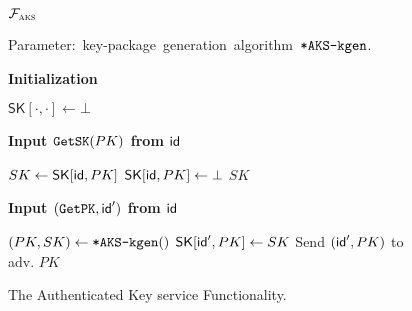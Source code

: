 \begin{figure}[!tbp]
	\vspace*{-1.5em}\begin{systembox}{$\mathcal{F}_{\normalfont\textsc{aks}}$}
		\begin{flushleft}
			\mbox{Parameter: key-package generation algorithm ${\textnormal{\tt*AKS-kgen}}$.}

			\hrulefill
			\vspace*{-0.5em}
		\end{flushleft}
			\begin{minipage}[t]{0.49\linewidth}
				{\bf Initialization}
				\begin{algorithmic}
					\State $\mathsf{SK}[\cdot, \cdot] \gets \bot$
				\end{algorithmic}


        {\bf Input ${\normalfont\texttt{GetSK}}(PK)$ from ${\mathsf{id}}$}
				\begin{algorithmic}
          \State $SK \gets \mathsf{SK}[{\mathsf{id}},PK]$
          \State $\mathsf{SK}[{\mathsf{id}},PK] \gets \bot$
          \State \Return $SK$
				\end{algorithmic}
			\end{minipage}
			\hfill
			\begin{minipage}[t]{0.49\linewidth}
				{\bf Input $({\normalfont\texttt{GetPK}},{\mathsf{id}}')$ from ${\mathsf{id}}$}
				\begin{algorithmic}
          \State $(PK, SK) \gets {\ensuremath{\textnormal{\tt*AKS-kgen}}}()$
					\State $\mathsf{SK}[{\mathsf{id}}',PK] \gets SK$
					\State Send $({\mathsf{id}}', PK)$ to adv.
					\State \Return $PK$
				\end{algorithmic}
			\end{minipage}
	\end{systembox}

	\caption{The Authenticated Key service Functionality.\vspace{0.5cm}}
	\label{fig:aks}
\end{figure}
